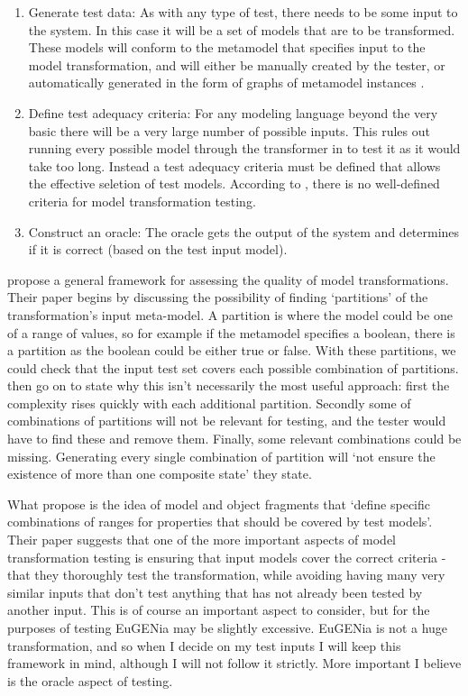 \begin{enumerate}
	\item Generate test data: As with any type of test, there needs to be some input to the system. In this case it will be a set of models that are to be transformed. These models will conform to the metamodel that specifies input to the model transformation, and will either be manually created by the tester, or automatically generated in the form of graphs of metamodel instances \citep{mttBarriers}.
	\item Define test adequacy criteria: For any modeling language beyond the very basic there will be a very large number of possible inputs. This rules out running every possible model through the transformer in to test it as it would take too long. Instead a test adequacy criteria must be defined that allows the effective seletion of test models. According to \citet{mttBarriers}, there is no well-defined criteria for model transformation testing.
	\item Construct an oracle: The oracle gets the output of the system and determines if it is correct (based on the test input model).
\end{enumerate}

\citet{fleureyMTInputs} propose a general framework for assessing the quality of model transformations. Their paper begins by discussing the possibility of finding `partitions' of the transformation's input meta-model. A partition is where the model could be one of a range of values, so for example if the metamodel specifies a boolean, there is a partition as the boolean could be either true or false. With these partitions, we could check that the input test set covers each possible combination of partitions. \citet{fleureyMTInputs} then go on to state why this isn't necessarily the most useful approach: first the complexity rises quickly with each additional partition. Secondly some of combinations of partitions will not be relevant for testing, and the tester would have to find these and remove them. Finally, some relevant combinations could be missing. Generating every single combination of partition will `not ensure the existence of more than one composite state' they state.

What \citet{fleureyMTInputs} propose is the idea of model and object fragments that `define specific combinations of ranges for properties that should be covered by test models'. Their paper suggests that one of the more important aspects of model transformation testing is ensuring that input models cover the correct criteria - that they thoroughly test the transformation, while avoiding having many very similar inputs that don't test anything that has not already been tested by another input. This is of course an important aspect to consider, but for the purposes of testing EuGENia may be slightly excessive. EuGENia is not a huge transformation, and so when I decide on my test inputs I will keep this framework in mind, although I will not follow it strictly. More important I believe is the oracle aspect of testing.

